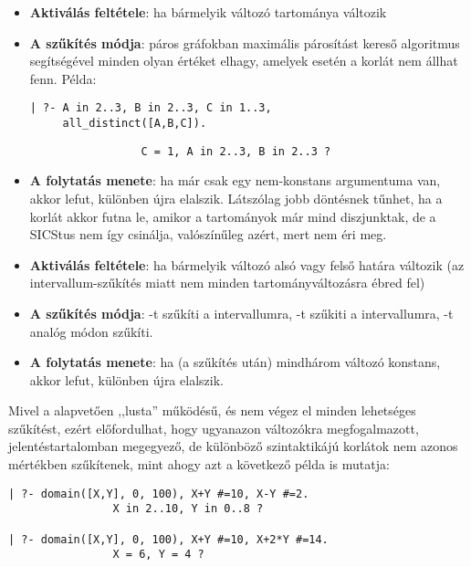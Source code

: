 \begin{itemize}
\item {\bf Aktiválás feltétele}: ha bármelyik változó tartománya változik
\item {\bf A szűkítés módja}: páros gráfokban maximális párosítást kereső
algoritmus segítségével minden olyan értéket elhagy, amelyek esetén a korlát nem
állhat fenn. Példa:
\begin{verbatim}
| ?- A in 2..3, B in 2..3, C in 1..3,
     all_distinct([A,B,C]).
\end{verbatim}
\begin{verbatim}
                 C = 1, A in 2..3, B in 2..3 ?
\end{verbatim}
\item {\bf A folytatás menete}: ha már csak egy nem-konstans argumentuma van,
akkor lefut, különben újra elalszik. Látszólag jobb döntésnek tűnhet, ha a korlát
akkor futna le, amikor a tartományok már mind diszjunktak, de a SICStus nem így
csinálja, valószínűleg azért, mert nem éri meg.
\end{itemize}

\begin{itemize}
\item {\bf Aktiválás feltétele}: ha bármelyik változó alsó vagy felső határa változik (az
intervallum-szűkítés miatt nem minden tartományváltozásra ébred fel)
\item {\bf A szűkítés módja}: -t szűkíti a  intervallumra, -t szűkiti a  intervallumra, -t analóg módon szűkíti.
\item {\bf A folytatás menete}: ha (a szűkítés után) mindhárom változó konstans, akkor lefut,
különben újra elalszik.
\end{itemize}

Mivel a \clpfd alapvetően ,,lusta'' működésű, és nem végez el minden lehetséges
szűkítést, ezért előfordulhat, hogy ugyanazon változókra megfogalmazott, jelentéstartalomban
megegyező, de különböző szintaktikájú korlátok nem azonos mértékben szűkítenek,
mint ahogy azt a következő példa is mutatja:

\begin{verbatim}
| ?- domain([X,Y], 0, 100), X+Y #=10, X-Y #=2.
                X in 2..10, Y in 0..8 ?

| ?- domain([X,Y], 0, 100), X+Y #=10, X+2*Y #=14.
                X = 6, Y = 4 ?
\end{verbatim}

